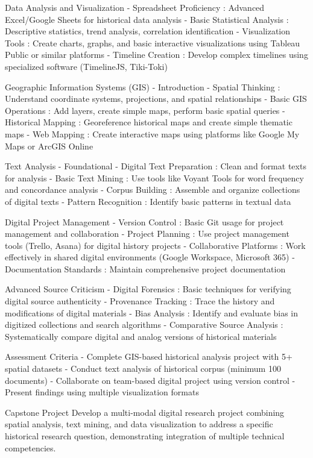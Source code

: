 \begin{appendices}
     Data Analysis and Visualization
-  Spreadsheet Proficiency : Advanced Excel/Google Sheets for historical data analysis
-  Basic Statistical Analysis : Descriptive statistics, trend analysis, correlation identification
-  Visualization Tools : Create charts, graphs, and basic interactive visualizations using Tableau Public or similar platforms
-  Timeline Creation : Develop complex timelines using specialized software (TimelineJS, Tiki-Toki)

     Geographic Information Systems (GIS) - Introduction
-  Spatial Thinking : Understand coordinate systems, projections, and spatial relationships
-  Basic GIS Operations : Add layers, create simple maps, perform basic spatial queries
-  Historical Mapping : Georeference historical maps and create simple thematic maps
-  Web Mapping : Create interactive maps using platforms like Google My Maps or ArcGIS Online

     Text Analysis - Foundational
-  Digital Text Preparation : Clean and format texts for analysis
-  Basic Text Mining : Use tools like Voyant Tools for word frequency and concordance analysis
-  Corpus Building : Assemble and organize collections of digital texts
-  Pattern Recognition : Identify basic patterns in textual data

     Digital Project Management
-  Version Control : Basic Git usage for project management and collaboration
-  Project Planning : Use project management tools (Trello, Asana) for digital history projects
-  Collaborative Platforms : Work effectively in shared digital environments (Google Workspace, Microsoft 365)
-  Documentation Standards : Maintain comprehensive project documentation

    Advanced Source Criticism
-  Digital Forensics : Basic techniques for verifying digital source authenticity
-  Provenance Tracking : Trace the history and modifications of digital materials
-  Bias Analysis : Identify and evaluate bias in digitized collections and search algorithms
-  Comparative Source Analysis : Systematically compare digital and analog versions of historical materials

    Assessment Criteria
- Complete GIS-based historical analysis project with 5+ spatial datasets
- Conduct text analysis of historical corpus (minimum 100 documents)
- Collaborate on team-based digital project using version control
- Present findings using multiple visualization formats

    Capstone Project
Develop a multi-modal digital research project combining spatial analysis, text mining, and data visualization to address a specific historical research question, demonstrating integration of multiple technical competencies.


\end{appendices}

